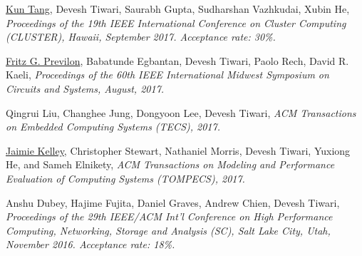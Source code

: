 {\textnormal{\newline \underline{Kun Tang}, Devesh Tiwari, Saurabh Gupta, Sudharshan Vazhkudai, Xubin He,}} {\textit{Proceedings of the 19th IEEE International Conference on Cluster Computing (CLUSTER), Hawaii, September 2017. Acceptance rate: 30\%.\newline}}{}{}{} %

{\textnormal{\newline \underline{Fritz G. Previlon}, Babatunde Egbantan, Devesh Tiwari, Paolo Rech, David R. Kaeli,}} {\textit{Proceedings of the 60th IEEE International Midwest Symposium on Circuits and Systems, August, 2017.\newline}}{}{}{} %

{\textnormal{\newline Qingrui Liu, Changhee Jung, Dongyoon Lee, Devesh Tiwari,}} {\textit{ACM Transactions on Embedded Computing Systems (TECS), 2017.\newline}}{}{}{} %

{\textnormal{\newline \underline{Jaimie Kelley}, Christopher Stewart, Nathaniel Morris, Devesh Tiwari, Yuxiong He, and Sameh Elnikety,}} {\textit{ACM Transactions on Modeling and Performance Evaluation of Computing Systems (TOMPECS), 2017.\newline \newline }}{}{}{} %



{\textnormal{\newline Anshu Dubey, Hajime Fujita, Daniel Graves, Andrew Chien, Devesh Tiwari,}} {\textit{Proceedings of the 29th IEEE/ACM Int'l Conference on High Performance Computing, Networking, Storage and Analysis (SC), Salt Lake City, Utah, November 2016. Acceptance rate: 18\%. \newline}}{}{}{} %

